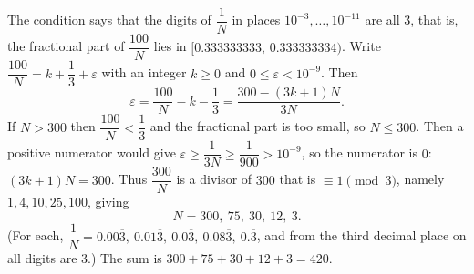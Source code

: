 The condition says that the digits of $\dfrac{1}{N}$ in places $10^{-3},\dots,10^{-11}$ are all $3$, that is, the fractional part of $\dfrac{100}{N}$ lies in $[0.333333333,\,0.333333334)$. Write $\dfrac{100}{N}=k+\dfrac{1}{3}+\varepsilon$ with an integer $k\ge0$ and $0\le\varepsilon<10^{-9}$. Then
\[
\varepsilon=\dfrac{100}{N}-k-\dfrac{1}{3}=\dfrac{300-(3k+1)N}{3N}.
\]
If $N>300$ then $\dfrac{100}{N}<\dfrac{1}{3}$ and the fractional part is too small, so $N\le300$. Then a positive numerator would give $\varepsilon\ge\dfrac{1}{3N}\ge\dfrac{1}{900}>10^{-9}$, so the numerator is $0$: $(3k+1)N=300$. Thus $\dfrac{300}{N}$ is a divisor of $300$ that is $\equiv1\pmod3$, namely $1,4,10,25,100$, giving
\[
N=300,\ 75,\ 30,\ 12,\ 3 .
\]
(For each, $\dfrac{1}{N}=0.00\overline{3},\ 0.01\overline{3},\ 0.0\overline{3},\ 0.08\overline{3},\ 0.\overline{3}$, and from the third decimal place on all digits are $3$.) The sum is $300+75+30+12+3=\boxed{420}$.
